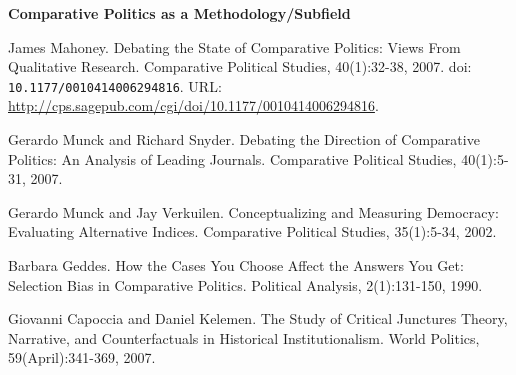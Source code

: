 \documentclass[letterpaper]{article}
\renewenvironment{itemize}{
  \begin{list}{}{
    \setlength{\leftmargin}{1.5em}
  }
}{
  \end{list}
}
\begin{document}
\begin{enumerate}
\begin{itemize}
	\end{itemize}



\item {\bf Comparative Politics as a Methodology/Subfield}
	\begin{itemize}
		\item[$\bullet$] James Mahoney. Debating the State of Comparative Politics: Views From Qualitative Research. Comparative Political Studies, 40(1):32-38, 2007. doi: \texttt{10.1177/0010414006294816}. URL: \url{http://cps.sagepub.com/cgi/doi/10.1177/0010414006294816}.
		\item[$\bullet$] Gerardo Munck and Richard Snyder. Debating the Direction of Comparative Politics: An Analysis of Leading Journals. Comparative Political Studies, 40(1):5-31, 2007.
		\item[$\bullet$] Gerardo Munck and Jay Verkuilen. Conceptualizing and Measuring Democracy: Evaluating Alternative Indices. Comparative Political Studies, 35(1):5-34, 2002.
		\item[$\bullet$] Barbara Geddes. How the Cases You Choose Affect the Answers You Get: Selection Bias in Comparative Politics. Political Analysis, 2(1):131-150, 1990.
		\item[$\bullet$] Giovanni Capoccia and Daniel Kelemen. The Study of Critical Junctures Theory, Narrative, and Counterfactuals in Historical Institutionalism. World Politics, 59(April):341-369, 2007.
	\end{itemize}
\end{enumerate}


 









%
%
\end{document}
